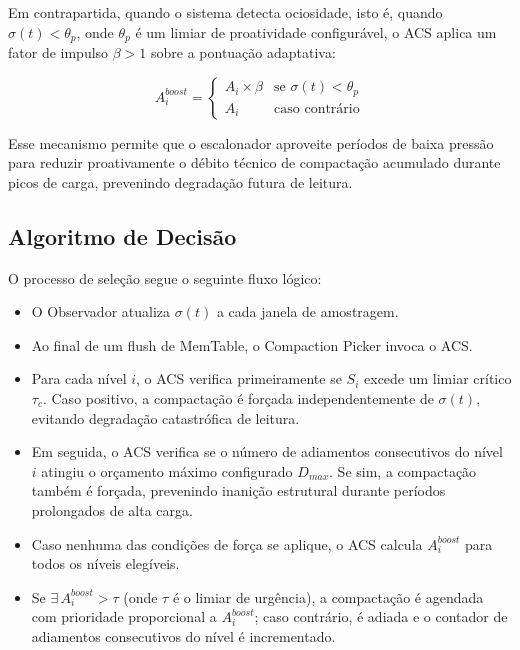 Em contrapartida, quando o sistema detecta ociosidade, isto é, quando
$\sigma(t) < \theta_p$, onde $\theta_p$ é um limiar de proatividade configurável,
o ACS aplica um fator de impulso $\beta > 1$ sobre a pontuação adaptativa:

\begin{equation}
    A_i^{boost} =
    \begin{cases}
        A_i \times \beta & \text{se } \sigma(t) < \theta_p \\
        A_i              & \text{caso contrário}
    \end{cases}
    \label{eq:boost}
\end{equation}

Esse mecanismo permite que o escalonador aproveite períodos de baixa pressão para
reduzir proativamente o débito técnico de compactação acumulado durante picos de
carga, prevenindo degradação futura de leitura.

\subsection*{Algoritmo de Decisão}

O processo de seleção segue o seguinte fluxo lógico:

\begin{itemize}
    \item O Observador atualiza $\sigma(t)$ a cada janela de amostragem.
    \item Ao final de um flush de MemTable, o Compaction Picker invoca o ACS.
    \item Para cada nível $i$, o ACS verifica primeiramente se $S_i$ excede um
    limiar crítico $\tau_c$. Caso positivo, a compactação é forçada
    independentemente de $\sigma(t)$, evitando degradação catastrófica de leitura.
    \item Em seguida, o ACS verifica se o número de adiamentos consecutivos do
    nível $i$ atingiu o orçamento máximo configurado $D_{max}$. Se sim, a
    compactação também é forçada, prevenindo inanição estrutural durante períodos
    prolongados de alta carga.
    \item Caso nenhuma das condições de força se aplique, o ACS calcula
    $A_i^{boost}$ para todos os níveis elegíveis.
    \item Se $\exists\, A_i^{boost} > \tau$ (onde $\tau$ é o limiar de urgência),
    a compactação é agendada com prioridade proporcional a $A_i^{boost}$; caso
    contrário, é adiada e o contador de adiamentos consecutivos do nível é
    incrementado.
\end{itemize}

